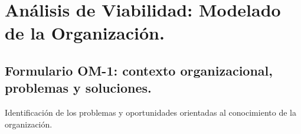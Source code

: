 \documentclass[12pt,a4paper,twoside,spanish]{article}      %
\begin{document}
 \pagestyle{myheadings} 

\setlength{\parindent}{1,5cm} \setlength{\parskip}{0,7cm}


\section{Análisis de Viabilidad: Modelado de la Organización.}



\subsection{Formulario OM-1: contexto organizacional, problemas y soluciones.}

Identificación de los problemas y oportunidades orientadas al conocimiento de la organización.
\end{document}
